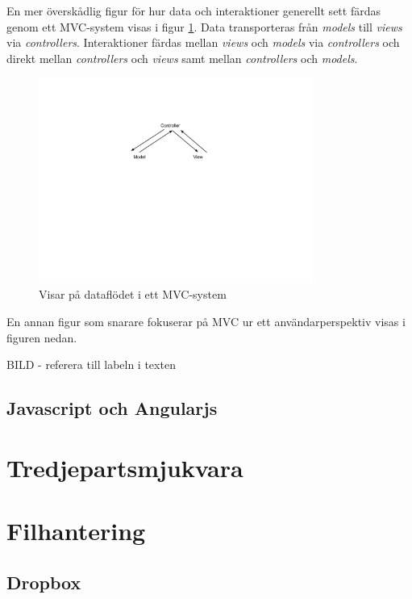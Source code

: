 \documentclass[a4paper,12pt,oneside,final]{extbook}
\begin{document}
En mer överskådlig figur för hur data och interaktioner generellt sett färdas genom ett MVC-system visas i figur \ref{fig:mvc1}. Data transporteras från \textit{models} till \textit{views} via \textit{controllers}. Interaktioner färdas mellan \textit{views} och \textit{models} via \textit{controllers} och direkt mellan \textit{controllers} och \textit{views} samt mellan \textit{controllers} och \textit{models}.

\begin{figure}[h]
\centering
\includegraphics[width=0.8\textwidth]{mvc1.png}
\caption{Visar på dataflödet i ett MVC-system}
\label{fig:mvc1}
\end{figure}

En annan figur som snarare fokuserar på MVC ur ett användarperspektiv visas i figuren nedan.

BILD - referera till labeln i texten

\subsection{Javascript och Angularjs}

\section{Tredjepartsmjukvara}

\section{Filhantering}

\subsection{Dropbox}
\end{document}
